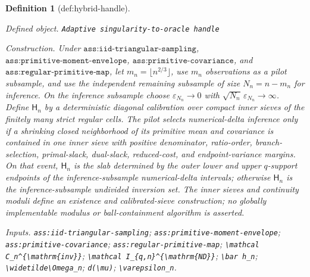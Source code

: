 \documentclass{article}
\newtheorem{definition}{Definition}
\begin{document}
\begin{definition}[def:hybrid-handle]\label{def:hybrid-handle}
\par\smallskip\noindent\emph{Defined object.} \texttt{Adaptive singularity-\allowbreak{}to-\allowbreak{}oracle handle}
\par\smallskip\noindent\emph{Construction.} Under \(\texttt{ass:iid-triangular-sampling}\), \(\texttt{ass:primitive-moment-envelope}\), \(\texttt{ass:primitive-covariance}\), and \(\texttt{ass:regular-primitive-map}\), let \(m_n=\lfloor n^{2/3}\rfloor\), use \(m_n\) observations as a pilot subsample, and use the independent remaining subsample of size \(N_n=n-m_n\) for inference.  On the inference subsample choose \(\varepsilon_{N_n}\to0\) with \(\sqrt{N_n}\,\varepsilon_{N_n}\to\infty\).  Define \(\mathsf H_n\) by a deterministic diagonal calibration over compact inner sieves of the finitely many strict regular cells.  The pilot selects numerical-delta inference only if a shrinking closed neighborhood of its primitive mean and covariance is contained in one inner sieve with positive denominator, ratio-order, branch-selection, primal-slack, dual-slack, reduced-cost, and endpoint-variance margins.  On that event, \(\mathsf H_n\) is the slab determined by the outer lower and upper \(q\)-support endpoints of the inference-subsample numerical-delta intervals; otherwise \(\mathsf H_n\) is the inference-subsample undivided inversion set.  The inner sieves and continuity moduli define an existence and calibrated-sieve construction; no globally implementable modulus or ball-containment algorithm is asserted.
\par\smallskip\noindent\emph{Inputs.} \texttt{ass:\allowbreak{}iid-\allowbreak{}triangular-\allowbreak{}sampling}; \texttt{ass:\allowbreak{}primitive-\allowbreak{}moment-\allowbreak{}envelope}; \texttt{ass:\allowbreak{}primitive-\allowbreak{}covariance}; \texttt{ass:\allowbreak{}regular-\allowbreak{}primitive-\allowbreak{}map}; \texttt{\textbackslash{}\allowbreak{}mathcal C\_\allowbreak{}n\textasciicircum{}\{\textbackslash{}\allowbreak{}mathrm\{inv\}\allowbreak{}\}\allowbreak{}}; \texttt{\textbackslash{}\allowbreak{}mathcal I\_\allowbreak{}\{q,\allowbreak{}n\}\allowbreak{}\textasciicircum{}\{\textbackslash{}\allowbreak{}mathrm\{ND\}\allowbreak{}\}\allowbreak{}}; \texttt{\textbackslash{}\allowbreak{}bar h\_\allowbreak{}n}; \texttt{\textbackslash{}\allowbreak{}widetilde\textbackslash{}\allowbreak{}Omega\_\allowbreak{}n}; \texttt{d(\textbackslash{}\allowbreak{}mu)}; \texttt{\textbackslash{}\allowbreak{}varepsilon\_\allowbreak{}n}.
\end{definition}
\end{document}
